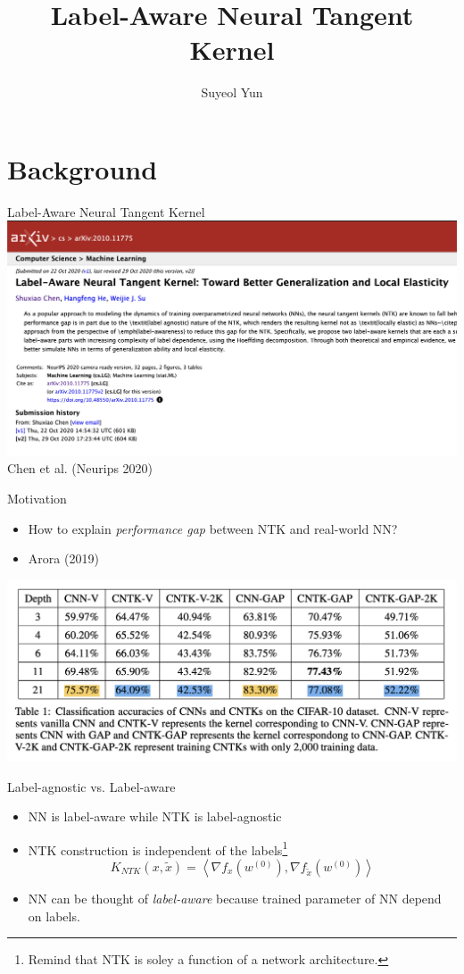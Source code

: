 \documentclass{beamer}
\begin{document}
	\title[]{Label-Aware Neural Tangent Kernel}
	\author[Suyeol Yun]{Suyeol Yun}
	\frame{\titlepage}
	\section{Background}

	\begin{frame}{Label-Aware Neural Tangent Kernel}
		\centering	\includegraphics[scale=0.3]{./images/arxiv2.png}
		Chen et al. (Neurips 2020)
	\end{frame}

	\begin{frame}{Motivation}
		\begin{itemize}
			\item How to explain \textit{performance gap} between NTK and real-world NN?
			\item Arora (2019)
		\end{itemize}
		\centering	\includegraphics[scale=0.325]{./images/perfgap.png}
	\end{frame}

	\begin{frame}{Label-agnostic vs. Label-aware}

		\begin{itemize}
			\item NN is label-aware while NTK is label-agnostic
			\item NTK construction is independent of the labels\footnote{Remind that NTK is soley a function of a network architecture.}
			$$K_{NTK}(x, \tilde{x})=\left\langle\nabla f_x\left(w^{(0)}\right), \nabla f_{\tilde{x}}\left(w^{(0)}\right)\right\rangle$$
			\item NN can be thought of \textit{label-aware} because trained parameter of NN depend on labels.
		\end{itemize}
	\end{frame}
\end{document}
